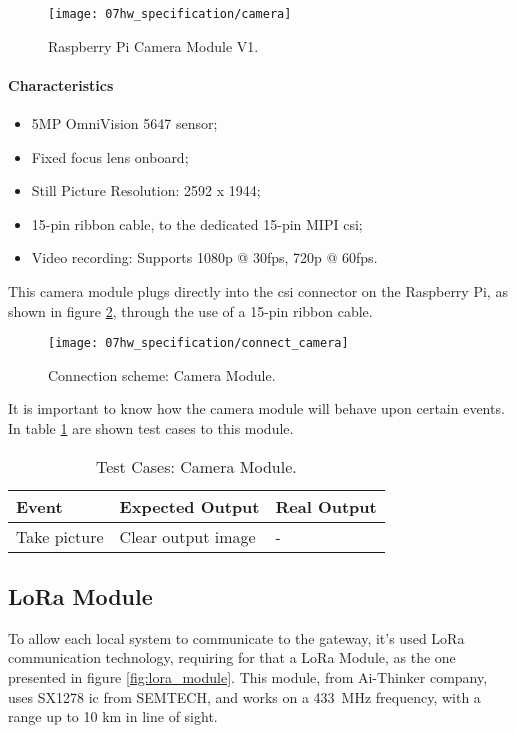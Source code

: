 \begin{figure}[H]
	\centering
	\texttt{[image: 07hw\_specification/camera]}
	\caption{Raspberry Pi Camera Module V1.}
	\label{fig:camera}
\end{figure}

\paragraph*{Characteristics}
\begin{itemize}
	\item 5MP OmniVision 5647 sensor;
	\item Fixed focus lens onboard;
	\item Still Picture Resolution: 2592 x 1944;
	\item 15-pin ribbon cable, to the dedicated 15-pin MIPI \ac{csi};
	\item Video recording: Supports 1080p @ 30fps, 720p @ 60fps.
\end{itemize}

\clearpage
{}
This camera module plugs directly into the \ac{csi} connector on the Raspberry Pi, as shown in figure \ref{fig:connect_camera}, through the use of a 15-pin ribbon cable.

\begin{figure}[ht]
	\centering
	\texttt{[image: 07hw\_specification/connect\_camera]}
	\caption{Connection scheme: Camera Module.}
	\label{fig:connect_camera}
\end{figure}

It is important to know how the camera module will behave upon certain events. In table \ref{table:test_camera} are shown test cases to this module.

\begin{table}[H]
	\centering
	\resizebox{\columnwidth}{!}
	{
	\begin{tabular}{|m{3cm}|m{5cm}||m{5cm}|}
		\hline
		\textbf{Event} & \textbf{Expected Output} & \textbf{Real Output}
		\\\hline\hline
		Take picture & Clear output image & -
		\\\hline
	\end{tabular}
	}
	\caption{Test Cases: Camera Module.}
	\label{table:test_camera}
\end{table}
\clearpage
\subsection{LoRa Module}
To allow each local system to communicate to the gateway, it's used LoRa communication technology, requiring for that a LoRa Module, as the one presented in figure \ref{fig:lora_module}. This module, from Ai-Thinker company, uses SX1278 \ac{ic} from SEMTECH, and works on a 433~MHz frequency, with a range up to 10 km in line of sight. \cite{sx1278} \cite{lora_module}

